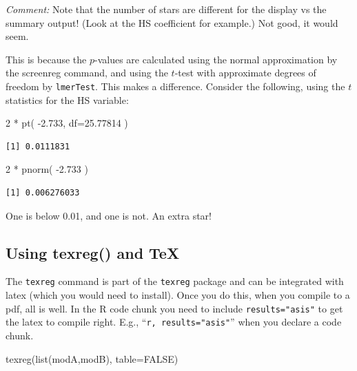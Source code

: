 \documentclass[
  letterpaper,
  DIV=11,
  numbers=noendperiod]{scrreprt}
\newenvironment{Shaded}{}{}
\newcommand{\AttributeTok}[1]{\textcolor[rgb]{0.49,0.56,0.16}{#1}}
\newcommand{\ConstantTok}[1]{\textcolor[rgb]{0.53,0.00,0.00}{#1}}
\newcommand{\DecValTok}[1]{\textcolor[rgb]{0.25,0.63,0.44}{#1}}
\newcommand{\FloatTok}[1]{\textcolor[rgb]{0.25,0.63,0.44}{#1}}
\newcommand{\FunctionTok}[1]{\textcolor[rgb]{0.02,0.16,0.49}{#1}}
\newcommand{\NormalTok}[1]{#1}
\newcommand{\SpecialCharTok}[1]{\textcolor[rgb]{0.25,0.44,0.63}{#1}}
\begin{document}
\emph{Comment:} Note that the number of stars are different for the
display vs the summary output! (Look at the HS coefficient for example.)
Not good, it would seem.

This is because the \(p\)-values are calculated using the normal
approximation by the screenreg command, and using the \(t\)-test with
approximate degrees of freedom by \texttt{lmerTest}. This makes a
difference. Consider the following, using the \(t\) statistics for the
HS variable:

\begin{Shaded}
\begin{Highlighting}[]
\DecValTok{2} \SpecialCharTok{*} \FunctionTok{pt}\NormalTok{( }\SpecialCharTok{{-}}\FloatTok{2.733}\NormalTok{, }\AttributeTok{df=}\FloatTok{25.77814}\NormalTok{ )}
\end{Highlighting}
\end{Shaded}

\begin{verbatim}
[1] 0.0111831
\end{verbatim}

\begin{Shaded}
\begin{Highlighting}[]
\DecValTok{2} \SpecialCharTok{*} \FunctionTok{pnorm}\NormalTok{( }\SpecialCharTok{{-}}\FloatTok{2.733}\NormalTok{ )}
\end{Highlighting}
\end{Shaded}

\begin{verbatim}
[1] 0.006276033
\end{verbatim}

One is below 0.01, and one is not. An extra star!

\subsection{Using texreg() and TeX}\label{using-texreg-and-tex}

The \texttt{texreg} command is part of the \texttt{texreg} package and
can be integrated with latex (which you would need to install). Once you
do this, when you compile to a pdf, all is well. In the R code chunk you
need to include \texttt{results="asis"} to get the latex to compile
right. E.g., ``\texttt{r,\ results="asis"}'' when you declare a code
chunk.

\begin{Shaded}
\begin{Highlighting}[]
\FunctionTok{texreg}\NormalTok{(}\FunctionTok{list}\NormalTok{(modA,modB), }\AttributeTok{table=}\ConstantTok{FALSE}\NormalTok{)}
\end{Highlighting}
\end{Shaded}
\end{document}
